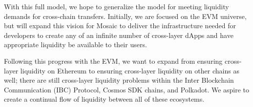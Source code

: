 With this full model, we hope to generalize the model for meeting liquidity demands for cross-chain transfers. Initially, we are focused on the EVM universe, but will expand this vision for Mosaic to deliver the infrastructure needed for developers to create any of an infinite number of cross-layer dApps and have appropriate liquidity be available to their users.

Following this progress with the EVM, we want to expand from ensuring cross-layer liquidity on Ethereum to ensuring cross-layer liquidity on other chains as well; there are still cross-layer liquidity problems within the Inter Blockchain Communication (IBC) Protocol, Cosmos SDK chains, and Polkadot. We aspire to create a continual flow of liquidity between all of these ecosystems.
